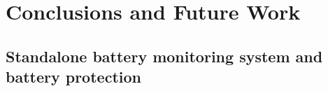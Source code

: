 \section{Conclusions and Future Work}
\subsection{Standalone battery monitoring system and battery protection}